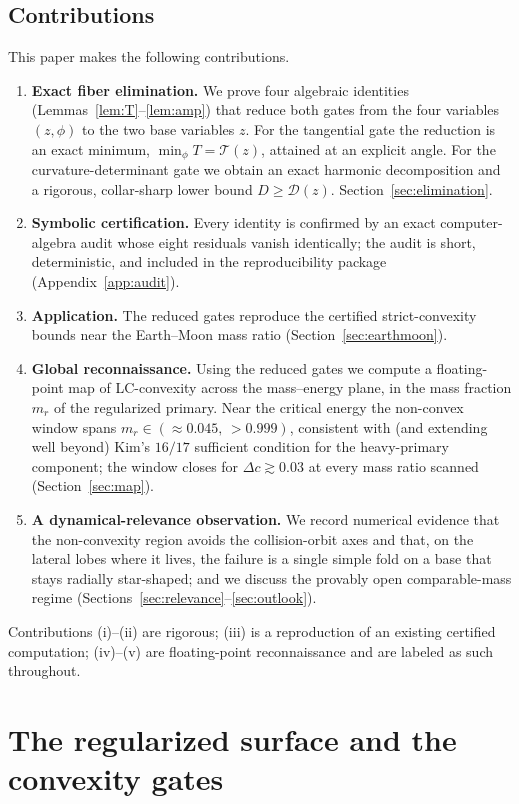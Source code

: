 \documentclass[11pt,reqno]{amsart}
\theoremstyle{plain}
\theoremstyle{definition}
\newcommand{\calT}{\mathcal{T}}
\newcommand{\calD}{\mathcal{D}}
\begin{document}
\subsection{Contributions}
This paper makes the following contributions.
\begin{enumerate}
\item[(i)] \textbf{Exact fiber elimination.} We prove four algebraic identities (Lemmas~\ref{lem:T}--\ref{lem:amp}) that reduce both gates from the four variables $(z,\phi)$ to the two base variables $z$. For the tangential gate the reduction is an exact minimum, $\min_\phi T=\calT(z)$, attained at an explicit angle. For the curvature-determinant gate we obtain an exact harmonic decomposition and a rigorous, collar-sharp lower bound $D\ge\calD(z)$. Section~\ref{sec:elimination}.
\item[(ii)] \textbf{Symbolic certification.} Every identity is confirmed by an exact computer-algebra audit whose eight residuals vanish identically; the audit is short, deterministic, and included in the reproducibility package (Appendix~\ref{app:audit}).
\item[(iii)] \textbf{Application.} The reduced gates reproduce the certified strict-convexity bounds near the Earth--Moon mass ratio (Section~\ref{sec:earthmoon}).
\item[(iv)] \textbf{Global reconnaissance.} Using the reduced gates we compute a floating-point map of LC-convexity across the mass--energy plane, in the mass fraction $m_r$ of the regularized primary. Near the critical energy the non-convex window spans $m_r\in(\approx 0.045,\,>0.999)$, consistent with (and extending well beyond) Kim's $16/17$ sufficient condition for the heavy-primary component; the window closes for $\Delta c\gtrsim 0.03$ at every mass ratio scanned (Section~\ref{sec:map}).
\item[(v)] \textbf{A dynamical-relevance observation.} We record numerical evidence that the non-convexity region avoids the collision-orbit axes and that, on the lateral lobes where it lives, the failure is a single simple fold on a base that stays radially star-shaped; and we discuss the provably open comparable-mass regime (Sections~\ref{sec:relevance}--\ref{sec:outlook}).
\end{enumerate}
Contributions (i)--(ii) are rigorous; (iii) is a reproduction of an existing certified computation; (iv)--(v) are floating-point reconnaissance and are labeled as such throughout.

\section{The regularized surface and the convexity gates}\label{sec:setup}
\end{document}
